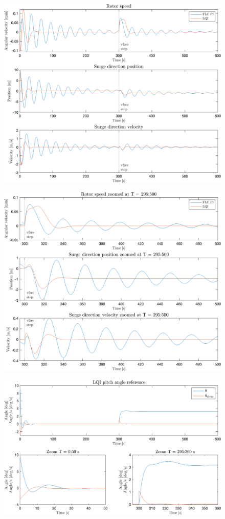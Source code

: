 \begin{figure}[ht]
	\centering
	\includegraphics[width=0.7\linewidth]{Graphics/TestResults/linearModPerf/02_W_py_vy_comp.png}
	\caption{}
	\label{fig:02_W_py_vy_comp}
\end{figure}

\begin{figure}[ht]
	\centering
	\includegraphics[width=0.7\linewidth]{Graphics/TestResults/linearModPerf/03_W_py_vy_comp_zoom.png}
	\caption{}
	\label{fig:03_W_py_vy_comp_zoom}
\end{figure}

\begin{figure}[ht]
	\centering
	\includegraphics[width=0.7\linewidth]{Graphics/TestResults/linearModPerf/01_pitch.png}
	\caption{}
	\label{fig:01_pitch}
\end{figure}